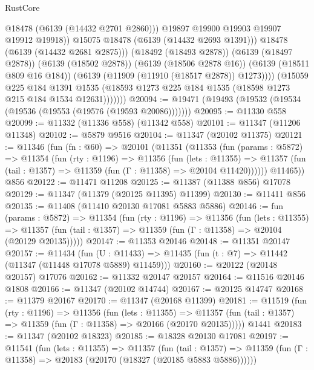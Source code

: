\begin{lexlean}{RustCore}
\begin{coremodule}
                          @18478
                          (@6139 (@14432 @2701 @2860)))
                        @19897
                        @19900
                        @19903
                        @19907
                        @19912
                        @19918))
                    @15075
                    @18478
                    (@6139 (@14432 @2693 @1391)))
                  @18478
                  (@6139 (@14432 @2681 @2875)))
                (@18492 (@18493 @2878))
                (@6139 (@18497 @2878))
                (@6139 (@18502 @2878))
                (@6139 (@18506 @2878 @16))
                (@6139 (@18511 @809 @16 @184))
                (@6139 (@11909 (@11910 (@18517 @2878)) @1273))))
            (@15059
              @225
              @184
              @1391
              @1535
              (@18593 @1273 @225 @184 @1535 (@18598 @1273 @215 @184 @1534 @12631)))))))
@20094 := @19471 (@19493 (@19532 (@19534 (@19536 (@19553 (@19576 (@19593 @20086)))))))
@20095 := @11330 @558
@20099 := @11332 (@11336 @558) (@11342 @558)
@20101 := @11347 (@11206 @11348)
@20102 := @5879 @9516
@20104 := @11347 (@20102 @11375)
@20121 := @11346
    (fun (fn : @60) =>
    @20101
      (@11351
        (@11353
          (fun (params : @5872) =>
          @11354
            (fun (rty : @1196) =>
            @11356
              (fun (lets : @11355) =>
              @11357 (fun (tail : @1357) => @11359 (fun (Γ : @11358) => @20104 @11420))))))
        @11465))
    @856
@20122 := @11471 @11208
@20125 := @11387 (@11388 @856) @17078
@20129 := @11347 (@11379 (@20125 @11395) @11399)
@20130 := @11411 @856
@20135 := @11408 (@11410 @20130 @17081 @5883 @5886)
@20146 := fun (params : @5872) =>
  @11354
    (fun (rty : @1196) =>
    @11356
      (fun (lets : @11355) =>
      @11357 (fun (tail : @1357) => @11359 (fun (Γ : @11358) => @20104 (@20129 @20135)))))
@20147 := @11353 @20146
@20148 := @11351 @20147
@20157 := @11434
    (fun (U : @11433) => @11435 (fun (t : @7) => @11442 (@11347 (@11448 @17078 @5889) @11459)))
@20160 := @20122 (@20148 @20157) @17076
@20162 := @11332 @20147 @20157
@20164 := @11516 @20146 @1808
@20166 := @11347 (@20102 @14744)
@20167 := @20125 @14747
@20168 := @11379 @20167
@20170 := @11347 (@20168 @11399)
@20181 := @11519
    (fun (rty : @1196) =>
    @11356
      (fun (lets : @11355) =>
      @11357 (fun (tail : @1357) => @11359 (fun (Γ : @11358) => @20166 (@20170 @20135)))))
    @1441
@20183 := @11347 (@20102 @18323)
@20185 := @18328 @20130 @17081
@20197 := @11541
    (fun (lets : @11355) =>
    @11357
      (fun (tail : @1357) =>
      @11359 (fun (Γ : @11358) => @20183 (@20170 (@18327 (@20185 @5883 @5886))))))

\end{coremodule}
\end{lexlean}
